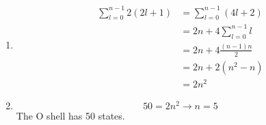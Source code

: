 \documentclass{article}
\begin{document}
\begin{enumerate}
  \item

        \begin{align*}
          \sum_{l = 0}^{n - 1} 2 (2 l + 1) & = \sum_{l = 0}^{n - 1} (4 l + 2) \\
                                           & = 2 n + 4 \sum_{l = 0}^{n - 1} l \\
                                           & = 2 n + 4 \frac{(n - 1) n}{2}    \\
                                           & = 2 n + 2 (n^2 - n)              \\
                                           & = 2 n^2
        \end{align*}

  \item \[50 = 2 n^2 \rightarrow n = 5\] The O shell has 50 states.
\end{enumerate}

\setcounter{subsubsection}{48}
\subsubsection{}
\end{document}
